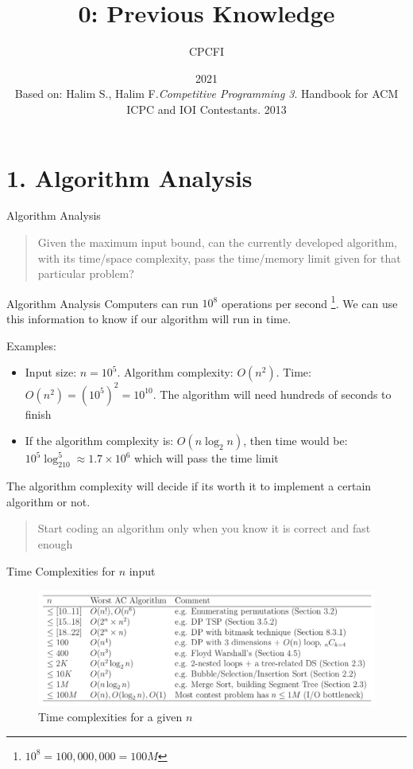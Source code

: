 \documentclass{beamer}
\title{0: Previous Knowledge}
\author{CPCFI}
\institute{UNAM's School of Engineering}
\date{2021 \\ \vspace{0.5cm} \scriptsize{Based on: Halim S., Halim F.\textit{Competitive Programming 3}}. Handbook for ACM ICPC and IOI Contestants. 2013}
\begin{document}
\frame{\titlepage}


\section{1. Algorithm Analysis}
\begin{frame}{Algorithm Analysis}
    \begin{quote}
        Given the maximum input bound, can the currently developed algorithm, with its time/space complexity, pass the time/memory limit given for that particular problem?
    \end{quote}
\end{frame}

\begin{frame}{Algorithm Analysis}
    Computers can run $10^8$ operations per second \footnote{$10^8 = 100,000,000 = 100M$}. We can use this information to know if our algorithm will run in time. 
    
    Examples:
    \begin{itemize}
        \item Input size: $n=10^5$. Algorithm complexity: $O(n^2)$. Time: $O(n^2) = (10^5)^2 = 10^{10}$. The algorithm will need hundreds of seconds to finish
        \item If the algorithm complexity is: $O(n\log_2n)$, then time would be: $10^5\log_210^5 \approx 1.7\times 10^6$ which will pass the time limit
    \end{itemize}
    
    The algorithm complexity will decide if its worth it to implement a certain algorithm or not. 
    \begin{quote}
        Start coding an algorithm only when you know it is correct and fast enough
    \end{quote}
\end{frame}

\begin{frame}{Time Complexities for $n$ input}
    \begin{figure}
        \centering
        \includegraphics[scale=0.25]{imgs/1-CompetitiveProgramming/rule_of_thumb_complexities.png}
        \caption{Time complexities for a given $n$}
        \label{fig:my_label_20}
    \end{figure}
\end{frame}
\end{document}
